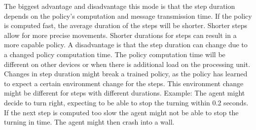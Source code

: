 The biggest advantage and disadvantage this mode is that the step duration depends on the policy's computation and message transmission time. If the policy is computed fast, the average duration of the steps will be shorter. Shorter steps allow for more precise movements. Shorter durations for steps can result in a more capable policy.
A disadvantage is that the step duration can change due to a changed policy computation time. The policy computation time will be different on other devices or when there is additional load on the processing unit.
Changes in step duration might break a trained policy, as the policy has learned to expect a certain environment change for the steps. This environment change might be different for steps with different durations.
Example: The agent might decide to turn right, expecting to be able to stop the turning within 0.2 seconds. If the next step is computed too slow the agent might not be able to stop the turning in time. The agent might then crash into a wall.


\newcommand\offset{-3}


